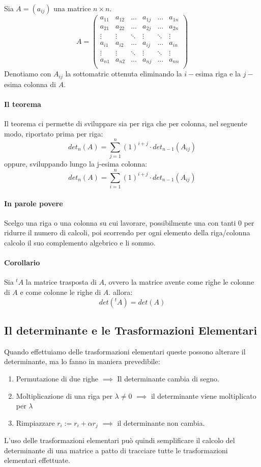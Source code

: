 Sia $A = (a_{ij})$ una matrice $n\times n$.
\[
	A = \begin{pmatrix}
		a_{11} & a_{12} & ...    & a_{1j} & ...    & a_{1n} \\
		a_{21} & a_{22} & ...    & a_{2j} & ...    & a_{2n} \\
		\vdots & \vdots & \ddots & \vdots & \ddots & \vdots \\
		a_{i1} & a_{i2} & ...    & a_{ij} & ...    & a_{in} \\
		\vdots & \vdots & \ddots & \vdots & \ddots & \vdots \\
		a_{n1} & a_{n2} & ...    & a_{nj} & ...    & a_{nn} \\
	\end{pmatrix}
\]
Denotiamo con $A_{ij}$ la sottomatric ottenuta eliminando la $i-$esima riga e la $j-$esima colonna di $A$.

\paragraph{Il teorema}
Il teorema ci permette di sviluppare sia per riga che per colonna, nel seguente modo, riportato prima per riga:
\[det_n(A) = \sum_{j=1}^{n} (1)^{i+j} \cdot det_{n-1}(A_{ij})\]
oppure, sviluppando lungo la j-esima colonna:
\[det_n(A) = \sum_{i=1}^{n} (1)^{i+j} \cdot det_{n-1}(A_{ij})\]

\paragraph{In parole povere}
Scelgo una riga o una colonna su cui lavorare, possibilmente una con tanti 0 per ridurre il numero di calcoli,
poi scorrendo per ogni elemento della riga/colonna calcolo il suo complemento algebrico e li sommo.

\paragraph{Corollario}
Sia $^tA$ la matrice trasposta di $A$, ovvero la matrice avente come righe le colonne di $A$ e come colonne le righe di $A$. allora:
\[ det(^tA) = det(A)\]

\subsection{Il determinante e le Trasformazioni Elementari}
Quando effettuiamo delle trasformazioni elementari queste possono alterare il determinante, ma lo fanno in maniera prevedibile:
\begin{enumerate}
	\item Permutazione di due righe $\implies$ Il determinante cambia di segno.
	\item Moltiplicazione di una riga per $\lambda \neq 0$  $\implies$ il determinante viene moltiplicato per $\lambda$
	\item Rimpiazzare $r_i := r_i + \alpha r_j$ $\implies$ il determinante non cambia.
\end{enumerate}
L'uso delle trasformazioni elementari può quindi semplificare il calcolo del determinante di una matrice a patto di tracciare tutte le trasformazioni elementari effettuate.

